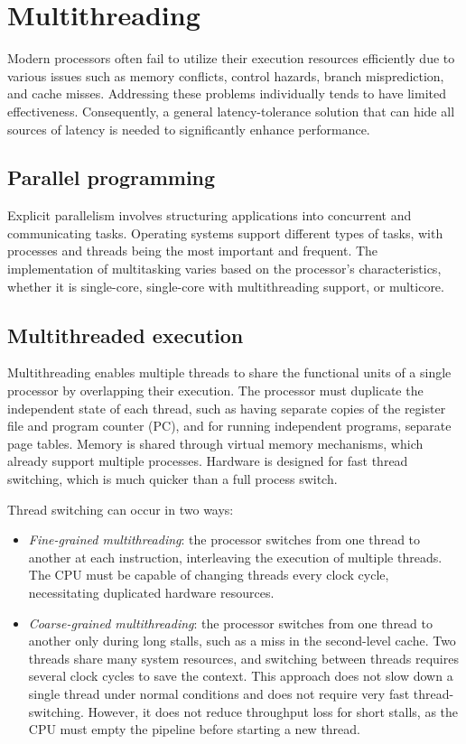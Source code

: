 \section{Multithreading}

Modern processors often fail to utilize their execution resources efficiently due to various issues such as memory conflicts, control hazards, branch misprediction, and cache misses. 
Addressing these problems individually tends to have limited effectiveness. 
Consequently, a general latency-tolerance solution that can hide all sources of latency is needed to significantly enhance performance.

\subsection{Parallel programming}
Explicit parallelism involves structuring applications into concurrent and communicating tasks. 
Operating systems support different types of tasks, with processes and threads being the most important and frequent. 
The implementation of multitasking varies based on the processor's characteristics, whether it is single-core, single-core with multithreading support, or multicore.

\subsection{Multithreaded execution}
Multithreading enables multiple threads to share the functional units of a single processor by overlapping their execution. 
The processor must duplicate the independent state of each thread, such as having separate copies of the register file and program counter (PC), and for running independent programs, separate page tables. 
Memory is shared through virtual memory mechanisms, which already support multiple processes. 
Hardware is designed for fast thread switching, which is much quicker than a full process switch.

Thread switching can occur in two ways:
\begin{itemize}
    \item \textit{Fine-grained multithreading}: the processor switches from one thread to another at each instruction, interleaving the execution of multiple threads.
        The CPU must be capable of changing threads every clock cycle, necessitating duplicated hardware resources.
    \item \textit{Coarse-grained multithreading}: the processor switches from one thread to another only during long stalls, such as a miss in the second-level cache. 
        Two threads share many system resources, and switching between threads requires several clock cycles to save the context. 
        This approach does not slow down a single thread under normal conditions and does not require very fast thread-switching.
        However, it does not reduce throughput loss for short stalls, as the CPU must empty the pipeline before starting a new thread.
\end{itemize}

